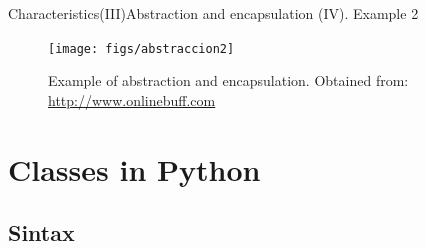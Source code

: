 \documentclass[10pt,compress]{beamer} %
\begin{document}
\begin{frame}{Characteristics(III)}{Abstraction and encapsulation (IV). Example 2}
	\begin{figure}
		\texttt{[image: figs/abstraccion2]}
		\caption{{\scriptsize Example of abstraction and encapsulation. Obtained from: \url{http://www.onlinebuff.com}}}
	\end{figure}
\end{frame}

\section{Classes in Python}
   \subsection{Sintax}

\end{document}
